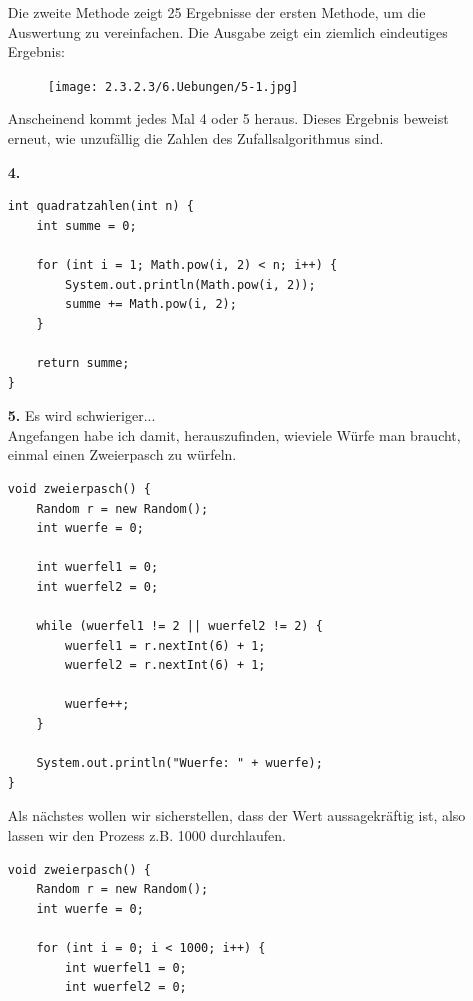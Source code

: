 \documentclass{scrartcl}   %
\begin{document}
\begin{itemize}
    Die zweite Methode zeigt 25 Ergebnisse der ersten Methode, um die Auswertung zu vereinfachen. Die Ausgabe zeigt ein ziemlich eindeutiges Ergebnis:
    
    \begin{figure}[ht]
	    \centering
	    \texttt{[image: 2.3.2.3/6.Uebungen/5-1.jpg]}
    \end{figure}
    
    Anscheinend kommt jedes Mal 4 oder 5 heraus. Dieses Ergebnis beweist erneut, wie \glqq unzufällig\grqq{} die Zahlen des Zufallsalgorithmus sind.
    
    \newpage
    
    \item[\textbf{4.}]
    \begin{lstlisting}
int quadratzahlen(int n) {
    int summe = 0;
    
    for (int i = 1; Math.pow(i, 2) < n; i++) {
        System.out.println(Math.pow(i, 2));
        summe += Math.pow(i, 2);
    }
    
    return summe;
}
    \end{lstlisting}
    \item[\textbf{5.}] Es wird schwieriger...\\
    Angefangen habe ich damit, herauszufinden, wieviele Würfe man braucht, einmal einen Zweierpasch zu würfeln.\\
    \begin{lstlisting}
void zweierpasch() {
    Random r = new Random();
    int wuerfe = 0;
    
    int wuerfel1 = 0;
    int wuerfel2 = 0;
    
    while (wuerfel1 != 2 || wuerfel2 != 2) {
        wuerfel1 = r.nextInt(6) + 1;
        wuerfel2 = r.nextInt(6) + 1;
    
        wuerfe++;
    }
    
    System.out.println("Wuerfe: " + wuerfe);
}
    \end{lstlisting}
    
    \newpage
    
    Als nächstes wollen wir sicherstellen, dass der Wert aussagekräftig ist, also lassen wir den Prozess z.B. 1000 durchlaufen.\\
    \begin{lstlisting}
void zweierpasch() {
    Random r = new Random();
    int wuerfe = 0;
    
    for (int i = 0; i < 1000; i++) {
        int wuerfel1 = 0;
        int wuerfel2 = 0;
        

\end{lstlisting}
\end{itemize}
\end{document}
